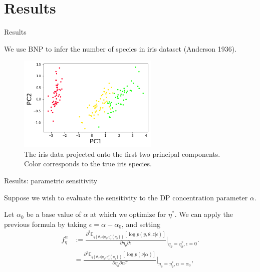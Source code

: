 \documentclass[10pt]{beamer}\usepackage[]{graphicx}\usepackage[]{color}
\newcommand{\Expect}{\mathbb{E}}
\newcommand{\etaopt}{\eta^{*}}
\newcommand{\etazopt}{\eta_z^{*}}
\newcommand{\etathetaopt}{\eta_\theta^{*}}
\newcommand{\QExpect}
{\Expect_{q\left(\theta, z \vert \eta_\theta, \etazopt(\eta_\theta)\right)}}
\newcommand{\atzero}{\Big\rvert_{\eta_\theta = \etathetaopt, \epsilon = 0}}
\begin{document}
\section{Results}

\begin{frame}{Results}

We use BNP to infer the number of species in iris dataset (Anderson 1936). 

\begin{figure}[!h]
\centering
\includegraphics[width = 0.6\textwidth]{./images/iris_data.png}

\caption{The iris data projected onto the first two principal components. Color corresponds to the true iris species. }

\setlength{\textfloatsep}{-10pt}
\end{figure}

\end{frame}

\begin{frame}{Results: parametric sensitivity}

Suppose we wish to evaluate the sensitivity to the DP concentration parameter $\alpha$.

\pause 

Let $\alpha_0$ be a base value of $\alpha$ at which we optimize for
$\etaopt$. We can apply the previous formula by taking $\epsilon = \alpha - \alpha_0$, and setting 
\begin{align*}
f^\alpha_\eta &:= \frac{\partial^2
      \QExpect \left[ \log p\left(y, \theta, z \vert \epsilon \right) \right]}{\partial \eta_\theta \partial \epsilon}
      \atzero.\\
&= \frac{\partial^2
    \QExpect
        \left[ \log p\left(\nu \vert \alpha \right) \right]}
{ \partial \eta_\theta \partial \alpha^T }
    \Big\rvert_{\eta_\theta = \etathetaopt, \alpha = \alpha_0},
\end{align*}

\end{frame}
\end{document}
